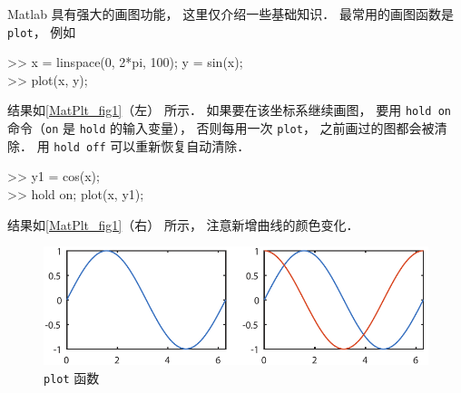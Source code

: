 

Matlab 具有强大的画图功能， 这里仅介绍一些基础知识． 最常用的画图函数是 \texttt{plot}， 例如
\begin{Command}
>> x = linspace(0, 2*pi, 100); y = sin(x);\\
>> plot(x, y);
\end{Command}
结果如\autoref{MatPlt_fig1}（左） 所示． 如果要在该坐标系继续画图， 要用 \texttt{hold on} 命令（\texttt{on} 是 \texttt{hold} 的输入变量）， 否则每用一次 \texttt{plot}， 之前画过的图都会被清除． 用 \texttt{hold off} 可以重新恢复自动清除．
\begin{Command}
>> y1 = cos(x);\\
>> hold on; plot(x, y1);
\end{Command}
结果如\autoref{MatPlt_fig1}（右） 所示， 注意新增曲线的颜色变化．
\begin{figure}[ht]
\centering
\includegraphics[width=13cm]{./figures/MatPlt1.pdf}
\caption{\texttt{plot} 函数} \label{MatPlt_fig1}
\end{figure}

